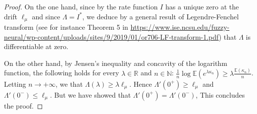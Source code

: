 \documentclass[10pt]{amsart}
\let\epsilon\varepsilon
\theoremstyle{plain}
\theoremstyle{definition}
\newcommand\E{\mathbb{E}}
\newcommand\R{\mathbb{R}}
\newcommand\N{\mathbb{N}}
\begin{document}
\begin{proof}
On the one hand, since by \cite[Th.\,1.2]{BMSS} the rate function $I$ has a unique zero at the drift $\ell_{\mu}$ and since $\Lambda=I^*$, we deduce by a general result of Legendre-Fenchel transform (see for instance Theorem 5 in \url{https://www.ise.ncsu.edu/fuzzy-neural/wp-content/uploads/sites/9/2019/01/or706-LF-transform-1.pdf}) that $\Lambda$ is differentiable at zero.

On the other hand, by Jensen's inequality and concavity of the logarithm function, the following holds for every $\lambda\in \R$ and $n\in \N$:
$\frac{1}{n}\log \E(e^{\lambda \kappa_n})\geq \lambda \frac{\E(\kappa_n)}{n}$. Letting $n\to +\infty$, we
that $\Lambda(\lambda)\geq \lambda \ell_{\mu}$. Hence $\Lambda'(0^+)\geq \ell_{\mu}$ and $\Lambda'(0^-)\leq \ell_{\mu}$. But we have showed that $\Lambda'(0^+)=\Lambda'(0^-)$, This concludes the proof.

\end{proof}
\end{document}
